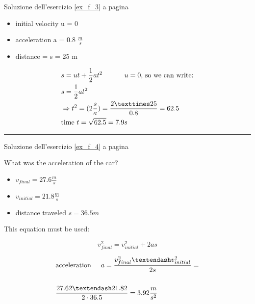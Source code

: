 Soluzione dell'esercizio \ref{ex_f_3} a pagina \pageref{ex_f_3}\label{sol_f_3}

\begin{itemize}
\item initial velocity u = 0
\item acceleration a = 0.8 $\frac{m}{s}$
\item distance = s = 25 m
\end{itemize}

\begin{equation}
\begin{split}
& s = ut +\frac{1}{2}at^2 \textrm{ \hspace{1cm}$u = 0$, so we can write:} \\
& s = \frac{1}{2}at^2\\
& \Rightarrow t^2 =(2 \frac{s}{a} ) = \frac{2×25}{0.8} = 62.5 \\
& \textrm{time }t = \sqrt{62.5} =  7.9 s
\end{split}
\end{equation}

\vspace{1cm}
\hrule
\vspace{1cm}

Soluzione dell'esercizio \ref{ex_f_4} a pagina \pageref{ex_f_4}\label{sol_f_4}

What was the acceleration of the car?


\begin{itemize}
\item $v_{final} = 27.6 \frac{m}{s}$
\item $v_{initial} = 21.8 \frac{m}{s}$
\item distance traveled $s=36.5 m$
\end{itemize}

This equation must be used: 

\begin{equation}
v_{final}^2 = v_{initial}^2 + 2as
\end{equation}

\begin{equation}
\begin{split}
& \textrm{acceleration}\hspace{0.5cm}a = \frac{v_{final}^2 – v_{initial}^2}{2s} = \\
\\
& \frac{27.62 – 21.82}{2\cdot 36.5} = 3.92 \frac{m}{s^2} \\
\end{split}
\end{equation}



